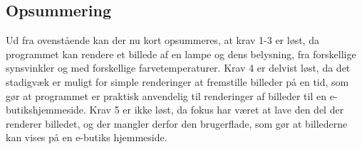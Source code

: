 \subsection*{Opsummering}

Ud fra ovenstående kan der nu kort opsummeres, at krav 1-3 er løst, da programmet kan rendere et billede af en lampe og dens belysning, fra forskellige synsvinkler og med forskellige farvetemperaturer. Krav 4 er delvist løst, da det stadigvæk er muligt for simple renderinger at fremstille billeder på en tid, som gør at programmet er praktisk anvendelig til renderinger af billeder til en e-butikshjemmeside. Krav 5 er ikke løst, da fokus har været at lave den del der renderer billedet, og der mangler derfor den brugerflade, som gør at billederne kan vises på en e-butiks hjemmeside. 
\clearpage